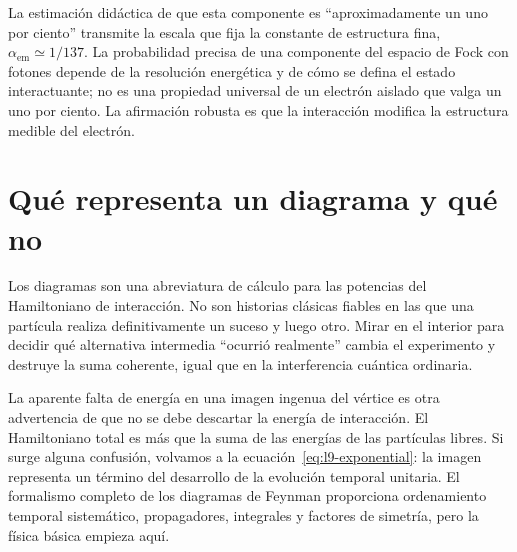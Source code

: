 La estimación didáctica de que esta componente es ``aproximadamente un uno por ciento'' transmite la escala que fija la constante de estructura fina, \(\alpha_{\mathrm{em}}\simeq 1/137\). La probabilidad precisa de una componente del espacio de Fock con fotones depende de la resolución energética y de cómo se defina el estado interactuante; no es una propiedad universal de un electrón aislado que valga un uno por ciento. La afirmación robusta es que la interacción modifica la estructura medible del electrón.

\section{Qué representa un diagrama y qué no}

Los diagramas son una abreviatura de cálculo para las potencias del Hamiltoniano de interacción. No son historias clásicas fiables en las que una partícula realiza definitivamente un suceso y luego otro. Mirar en el interior para decidir qué alternativa intermedia ``ocurrió realmente'' cambia el experimento y destruye la suma coherente, igual que en la interferencia cuántica ordinaria.

\begin{classroomqa}
\end{classroomqa}

La aparente falta de energía en una imagen ingenua del vértice es otra advertencia de que no se debe descartar la energía de interacción. El Hamiltoniano total es más que la suma de las energías de las partículas libres. Si surge alguna confusión, volvamos a la ecuación~\eqref{eq:l9-exponential}: la imagen representa un término del desarrollo de la evolución temporal unitaria. El formalismo completo de los diagramas de Feynman proporciona ordenamiento temporal sistemático, propagadores, integrales y factores de simetría, pero la física básica empieza aquí.

